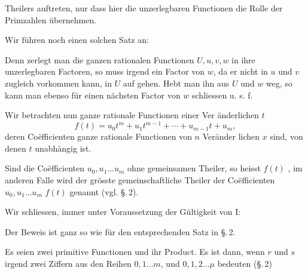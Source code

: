 
Theilers auftreten, nur dass hier die unzerlegbaren Functionen
die Rolle der Primzahlen übernehmen.

Wir führen noch einen solchen Satz an:


Denn zerlegt man die ganzen rationalen Functionen $U, u, v, w$
in ihre unzerlegbaren Factoren, so muss irgend ein Factor von
$w$, da er nicht in $u$ und $v$ zugleich vorkommen kann, in $U$ auf\-
gehen. Hebt man ihn aus $U$ und $w$ weg, so kann man ebenso
für einen nächsten Factor von $w$ schliessen u. s. f.

Wir betrachten nun ganze rationale Functionen einer Ver\-
änderlichen $t$
\[
f(t) = u_0 t^m + u_1 t^{m-1} + \cdots + u_{m-1} t + u_m,
\]
deren Co\"efficienten ganze rationale Functionen von $n$ Veränder\-
lichen $x$ sind, von denen $t$ unabhängig ist.

Sind die Co\"efficienten $u_0, u_1 \ldots u_m$ ohne gemeinsamen
Theiler, so heisst $f(t)$ , im anderen Falle wird der
grösste gemeinschaftliche Theiler der Co\"efficienten $u_0, u_1 \ldots u_m$
 $f(t)$ genannt (vgl. §.\,2).

Wir schliessen, immer unter Voraussetzung der Gültigkeit
von I:


Der Beweis ist ganz so wie für den entsprechenden Satz
in §.\,2.

Es seien
zwei primitive Functionen und
ihr Product. Es ist dann, wenn $r$ und $s$ irgend zwei Ziffern aus
den Reihen $0, 1 \ldots m$, und $0, 1, 2 \ldots \mu$ bedeuten (§.\,2)

